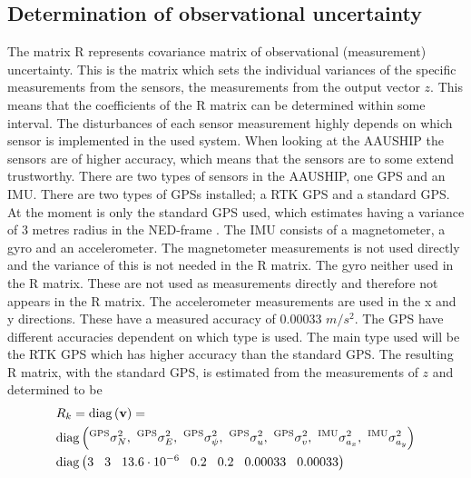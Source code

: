 \subsection{Determination of observational uncertainty}
The matrix R represents covariance matrix of observational (measurement) uncertainty. This is the matrix which sets the individual variances of the specific measurements from the sensors, the measurements from the output vector $z$. This means that the coefficients of the R matrix can be determined within some interval. The disturbances of each sensor measurement highly depends on which sensor is implemented in the used system. When looking at the AAUSHIP the sensors are of higher accuracy, which means that the sensors are to some extend trustworthy. There are two types of sensors in the AAUSHIP, one \ac{GPS} and an \ac{IMU}. There are two types of \ac{GPS}s installed; a \ac{RTK} \ac{GPS} and a standard \ac{GPS}. At the moment is only the standard \ac{GPS} used, which estimates having a variance of 3 metres radius in the \ac{NED}-frame . The \ac{IMU} consists of a magnetometer, a gyro and an accelerometer. The magnetometer measurements is not used directly and the variance of this is not needed in the R matrix. The gyro neither used in the R matrix. These are not used as measurements directly and therefore not appears in the R matrix. The accelerometer measurements are used in the x and y directions. These have a measured accuracy of 0.00033 $m/s^2$. The \ac{GPS} have different accuracies dependent on which type is used. The main type used will be the \ac{RTK} \ac{GPS} which has higher accuracy than the standard \ac{GPS}. The resulting R matrix, with the standard \ac{GPS}, is estimated from the measurements of $z$ and determined to be
\begin{align}
&R_k = \diag{\mathbf{v}} =\\ \nonumber
&\diag{^\text{GPS}\sigma_{N}^2,\ ^\text{GPS}\sigma_{E}^2,\ ^\text{GPS}\sigma_{\psi}^2,\ ^\text{GPS}\sigma_{u}^2,\ ^\text{GPS}\sigma_{v}^2,\ ^\text{IMU}\sigma_{a_x}^2,\ ^\text{IMU}\sigma_{a_y}^2}\\ \nonumber
&\diag{3\hspace{3mm} 3\hspace{3mm} 13.6\cdot 10^{-6}\hspace{3mm} 0.2\hspace{3mm} 0.2\hspace{3mm} 0.00033\hspace{3mm} 0.00033}
\end{align}

